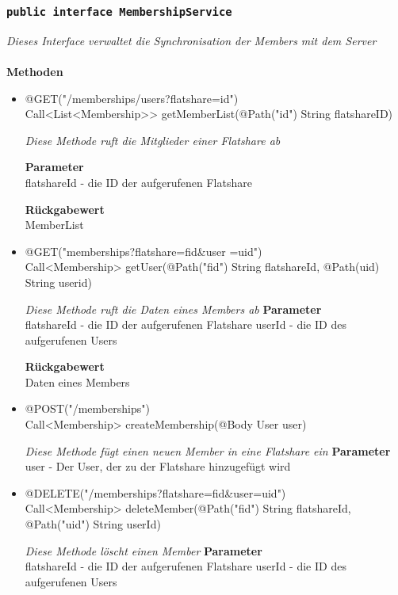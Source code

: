 	\subsubsection{\texttt{public interface MembershipService }}
\textit{Dieses Interface verwaltet die Synchronisation der Members mit dem Server}\\
\\
	\textbf{Methoden} \\
		\begin{itemize}
		\item{@GET("/memberships/users?flatshare={id}") \\ Call<List<Membership>> getMemberList(@Path("id") String flatshareID)}

		\textit{Diese Methode ruft die Mitglieder einer Flatshare ab}

		\textbf{Parameter} \\
	flatshareId - die ID der aufgerufenen Flatshare  

		\textbf{Rückgabewert} \\
	MemberList

      \item{@GET("memberships?flatshare={fid}\&user ={uid}")\\Call<Membership> getUser(@Path("fid") String flatshareId, @Path(\grqq uid\grqq) String userid)}

		\textit{Diese Methode ruft die Daten eines Members ab}        	
		\textbf{Parameter} \\
		flatshareId - die ID der aufgerufenen Flatshare 
		userId - die ID des aufgerufenen Users

		\textbf{Rückgabewert} \\
      Daten eines Members


      \item{@POST("/memberships")\\ Call<Membership> createMembership(@Body User user)}

		\textit{Diese Methode fügt einen neuen Member in eine Flatshare ein}        	
		\textbf{Parameter} \\
		user - Der User, der zu der Flatshare hinzugefügt wird 

	      \item{@DELETE("/memberships?flatshare={fid}\&user={uid}")\\Call<Membership> deleteMember(@Path("fid") String flatshareId, @Path("uid") String userId)}

		\textit{Diese Methode löscht einen Member}        	
		\textbf{Parameter} \\
		flatshareId - die ID der aufgerufenen Flatshare 
		userId - die ID des aufgerufenen Users
		

	 \end{itemize}

